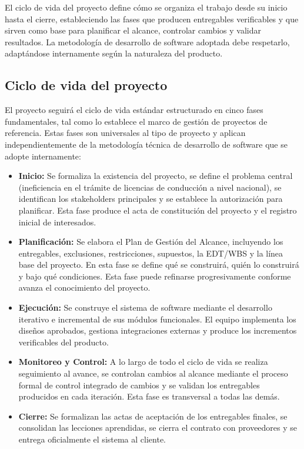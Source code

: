 
El ciclo de vida del proyecto define cómo se organiza el trabajo desde su inicio hasta el cierre, 
estableciendo las fases que producen entregables verificables y que sirven como base para 
planificar el alcance, controlar cambios y validar resultados. La metodología de desarrollo de 
software adoptada debe respetarlo, adaptándose internamente según la naturaleza del producto.

\subsection{Ciclo de vida del proyecto}

El proyecto seguirá el ciclo de vida estándar estructurado en cinco fases fundamentales, tal 
como lo establece el marco de gestión de proyectos de referencia. Estas fases son universales 
al tipo de proyecto y aplican independientemente de la metodología técnica de desarrollo de 
software que se adopte internamente:

\begin{itemize}
    \item \textbf{Inicio:} Se formaliza la existencia del proyecto, se define el problema central 
    (ineficiencia en el trámite de licencias de conducción a nivel nacional), se identifican los 
    stakeholders principales y se establece la autorización para planificar. Esta fase produce el 
    acta de constitución del proyecto y el registro inicial de interesados.

    \item \textbf{Planificación:} Se elabora el Plan de Gestión del Alcance, incluyendo los entregables, exclusiones, restricciones, supuestos, la 
    EDT/WBS y la línea base del proyecto. En esta fase se define qué se construirá, quién lo 
    construirá y bajo qué condiciones. Esta fase puede refinarse progresivamente conforme 
    avanza el conocimiento del proyecto.

    \item \textbf{Ejecución:} Se construye el sistema de software mediante el desarrollo 
    iterativo e incremental de sus módulos funcionales. El equipo implementa los diseños 
    aprobados, gestiona integraciones externas y produce los 
    incrementos verificables del producto.

    \item \textbf{Monitoreo y Control:} A lo largo de todo el ciclo de vida se realiza seguimiento 
    al avance, se controlan cambios al alcance mediante el proceso formal de control integrado 
    de cambios y se validan los entregables producidos en cada iteración. Esta fase es 
    transversal a todas las demás.

    \item \textbf{Cierre:} Se formalizan las actas de aceptación de los entregables finales, se 
    consolidan las lecciones aprendidas, se cierra el contrato con proveedores y se entrega 
    oficialmente el sistema al cliente.
\end{itemize}

